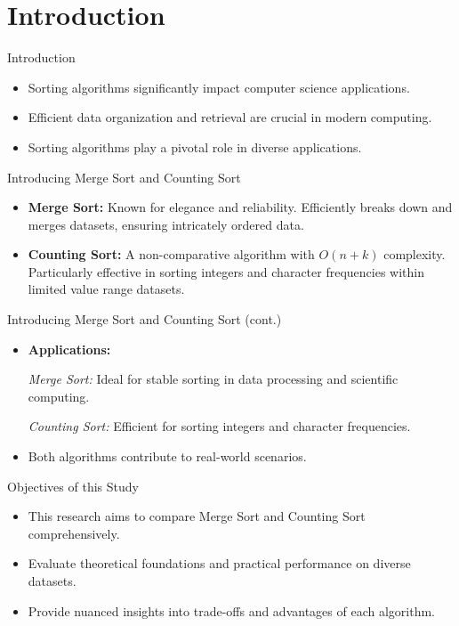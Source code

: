 \documentclass{beamer}
\begin{document}
	\section{Introduction}
	
	\begin{frame}{Introduction}
		\begin{itemize}
			\item Sorting algorithms significantly impact computer science applications.
	
			\item Efficient data organization and retrieval are crucial in modern computing.
			
			\item Sorting algorithms play a pivotal role in diverse applications. \cite{cormen2009introduction}
		\end{itemize}
	\end{frame}
	
	\begin{frame}{Introducing Merge Sort and Counting Sort}
		\begin{itemize}
			\item \textbf{Merge Sort:} Known for elegance and reliability. Efficiently breaks down and merges datasets, ensuring intricately ordered data.
			
			\item \textbf{Counting Sort:} A non-comparative algorithm with $O(n + k)$ complexity. Particularly effective in sorting integers and character frequencies within limited value range datasets.
		\end{itemize}
	\end{frame}
	
	\begin{frame}{Introducing Merge Sort and Counting Sort (cont.)}
		\begin{itemize}
			
			\item \textbf{Applications:}
			
			\textit{Merge Sort:} Ideal for stable sorting in data processing and scientific computing.
			
			\textit{Counting Sort:} Efficient for sorting integers and character frequencies.
			
			\item Both algorithms contribute to real-world scenarios.
		\end{itemize}
	\end{frame}
	
	\begin{frame}{Objectives of this Study}
		\begin{itemize}
			\item This research aims to compare Merge Sort and Counting Sort comprehensively.
			
			\item Evaluate theoretical foundations and practical performance on diverse datasets.
			
			\item Provide nuanced insights into trade-offs and advantages of each algorithm. \cite{googlescholar}
		\end{itemize}
	\end{frame}
\end{document}
